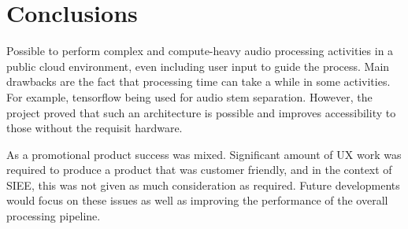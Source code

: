 \thispagestyle{plain}
\newpage
\section{Conclusions}\label{sec:conclusions}

\normalsize

Possible to perform complex and compute-heavy audio processing activities in a public cloud environment, even including user input to guide the process. Main drawbacks are the fact that processing time can take a while in some activities. For example, tensorflow being used for audio stem separation. However, the project proved that such an architecture is possible and improves accessibility to those without the requisit hardware.

As a promotional product success was mixed. Significant amount of UX work was required to produce a product that was customer friendly, and in the context of SIEE, this was not given as much consideration as required. Future developments would focus on these issues as well as improving the performance of the overall processing pipeline.
